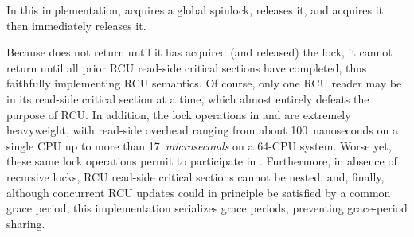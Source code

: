 In this implementation,  acquires a global
spinlock,  releases it, and
 acquires it then immediately releases it.

Because  does not return until it has acquired
(and released) the lock, it cannot return until all prior RCU read-side
critical sections have completed, thus faithfully implementing
RCU semantics.
Of course, only one RCU reader may be in its read-side critical section
at a time, which almost entirely defeats the purpose of RCU\@.
In addition, the lock operations in  and
 are extremely heavyweight,
with read-side overhead ranging from about 100~nanoseconds on a single 
CPU up to more than 17~\emph{microseconds} on a 64-CPU system.
Worse yet,
these same lock operations permit 
to participate in .
Furthermore, in absence of recursive locks,
RCU read-side critical sections cannot be nested, and, finally,
although concurrent RCU updates could in principle be satisfied by
a common grace period, this implementation serializes grace periods,
preventing grace-period sharing.

